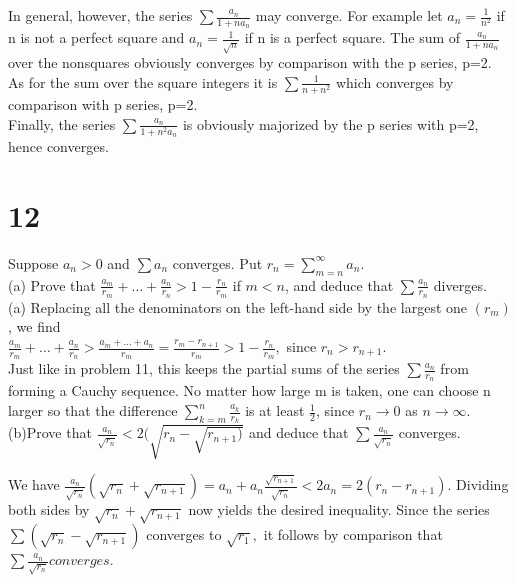 In general, however, the series $\sum \frac{a_n}{1+na_n}$ may converge. For example let $a_n= \frac{1}{n^2}$ if n is not a perfect square and $a_n= \frac{1}{\sqrt{n}}$ if n is a perfect square. The sum of $\frac{a_n}{1+na_n}$ over the nonsquares obviously converges by comparison with the p series, p=2. As for the sum over the square integers it is $\sum \frac{1}{n+n^2}$ which converges by comparison with p series, p=2. \\ 
Finally, the series $\sum \frac{a_n}{1+n^2 a_n}$ is obviously majorized by the p series with p=2, hence converges. \\ 
\section*{12}
Suppose $a_n>0$ and $\sum a_n$ converges. Put $r_n= \sum_{m=n}^\infty a_n.$ \\ 
(a) Prove that $\frac{a_m}{r_m}+ \dots +\frac{a_n}{r_n}>1-\frac{r_n}{r_m}$ if $m<n$, and deduce that $\sum \frac{a_n}{r_n}$ diverges. \\ 
(a) Replacing all the denominators on the left-hand side by the largest one $(r_m)$, we find \\ 
$\frac{a_m}{r_m}+ \dots + \frac{a_n}{r_n}> \frac{a_m + \dots +a_n}{r_m}= \frac{r_m-r_{n+1}}{r_m}>1-\frac{r_n}{r_m},$ since $r_n > r_{n+1}.$\\ 
Just like in problem 11, this keeps the partial sums of the series $\sum \frac{a_n}{r_n}$ from forming a Cauchy sequence. No matter how large m is taken, one can choose n larger so that the difference $\sum_{k=m}^n \frac{a_k}{r_k}$ is at least $\frac{1}{2}$, since $r_n \longrightarrow 0$ as $n \longrightarrow \infty.$ \\ 
(b)Prove that $\frac{a_n}{\sqrt{r_n}}<2(\sqrt{r_n -\sqrt{r_{n+1})}}$ and deduce that $ \sum \frac{a_n}{\sqrt{r_n}}$ converges. 


We have $\frac{a_n}{\sqrt{r_n}}(\sqrt{r_n}+\sqrt{r_{n+1}})= a_n +a_n \frac{\sqrt{r_{n+1}}}{\sqrt{r_n}}<2a_n=2(r_n -r_{n+1}).$ Dividing both sides by $\sqrt{r_n}+\sqrt{r_{n+1}}$ now yields the desired inequality. Since the series $\sum (\sqrt{r_n}-\sqrt{r_{n+1}})$ converges to $\sqrt{r_1},$ it follows by comparison that $\sum \frac{a_n}{\sqrt{r_n}} converges. $ \\

